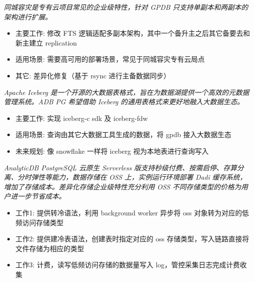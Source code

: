 \documentclass{resume}
\begin{document}
\textit{同城容灾是专有云项目常见的企业级特性，针对 GPDB 只支持单副本和两副本的架构进行扩展。}
\begin{onehalfspacing}
\begin{itemize}
  \item 主要工作: 修改 FTS 逻辑适配多副本架构，其中一个备升主之后其它备要去和新主建立 replication
  \item 适用场景: 需要高可用的部署场景，常见于同城容灾专有云局点
  \item 其它: 差异化修复（基于 rsync 进行主备数据同步）
\end{itemize}
\end{onehalfspacing}

\textit{Apache Iceberg 是一个开源的大数据表格式，旨在为数据湖提供一个高效的元数据管理系统。ADB PG 希望借助 Iceberg 的通用表格式来更好地融入大数据生态。}
\begin{onehalfspacing}
\begin{itemize}
  \item 主要工作: 实现 iceberg-c sdk 及 iceberg-fdw
  \item 适用场景: 查询由其它大数据工具生成的数据，将 gpdb 接入大数据生态
  \item 未来规划: 像 snowflake 一样将 iceberg 视为本地表进行查询写入
\end{itemize}
\end{onehalfspacing}

\textit{AnalyticDB PostgreSQL 云原生 Serverless 版支持秒级付费、按需启停、存算分离、分时弹性等能力，数据存储在 OSS 上，实例运行环境部署 Dadi 缓存系统，增加了存储成本。差异化存储企业级特性充分利用 OSS 不同存储类型的价格为用户进一步节省成本。}
\begin{onehalfspacing}
\begin{itemize}
  \item 工作1: 提供转冷语法，利用 background worker 异步将 oss 对象转为对应的低频访问存储类型
  \item 工作2: 提供建冷表语法，创建表时指定对应的 oss 存储类型，写入链路直接将文件存储为相应的类型
  \item 工作3: 计费，读写低频访问存储的数据量写入 log，管控采集日志完成计费收集
\end{itemize}
\end{onehalfspacing}
\end{document}
